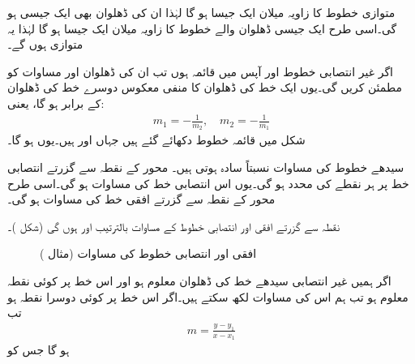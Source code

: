 متوازی خطوط کا زاویہ میلان ایک جیسا ہو گا لہٰذا  ان  کی ڈھلوان بھی ایک جیسی ہو گی۔اسی طرح ایک جیسی ڈھلوان والے خطوط کا زاویہ میلان ایک جیسا ہو گا لہٰذا یہ متوازی ہوں گے۔

اگر غیر انتصابی خطوط  اور  آپس میں قائمہ ہوں تب ان کی ڈھلوان  اور  مساوات  کو مطمئن کریں گی۔یوں ایک خط کی ڈھلوان کا منفی معکوس  دوسرے خط کی ڈھلوان کے برابر ہو گا، یعنی:
\begin{align*}
m_1=-\frac{1}{m_2},\quad m_2=-\frac{1}{m_1}
\end{align*}
شکل  میں قائمہ خطوط دکھائے گئے ہیں جہاں    اور  ہیں۔یوں  ہو گا۔

سیدھے خطوط کی مساوات نسبتاً سادہ ہوتی ہیں۔ محور کے نقطہ  سے گزرتے انتصابی خط پر ہر نقطے کی  محدد  ہو گی۔یوں اس انتصابی خط کی مساوات  ہو گی۔اسی طرح  محور کے نقطہ  سے گزرتے افقی خط کی مساوات  ہو گی۔

نقطہ  سے گزرتے افقی اور انتصابی خطوط کے مساوات بالترتیب  اور  ہوں گی (شکل )۔
\begin{figure}
\centering
{}
\caption{افقی اور انتصابی خطوط کی مساوات (مثال )}
\label{شکل_مثال_ابتدا_افقی_انتصابی_مساوات}
\end{figure}

اگر ہمیں غیر انتصابی سیدھے خط  کی ڈھلوان معلوم ہو اور اس خط پر کوئی نقطہ  معلوم ہو تب ہم اس کی مساوات لکھ سکتے ہیں۔اگر اس خط پر  کوئی دوسرا نقطہ ہو تب
\begin{align*}
m=\frac{y-y_1}{x-x_1}
\end{align*}
ہو گا جس کو

